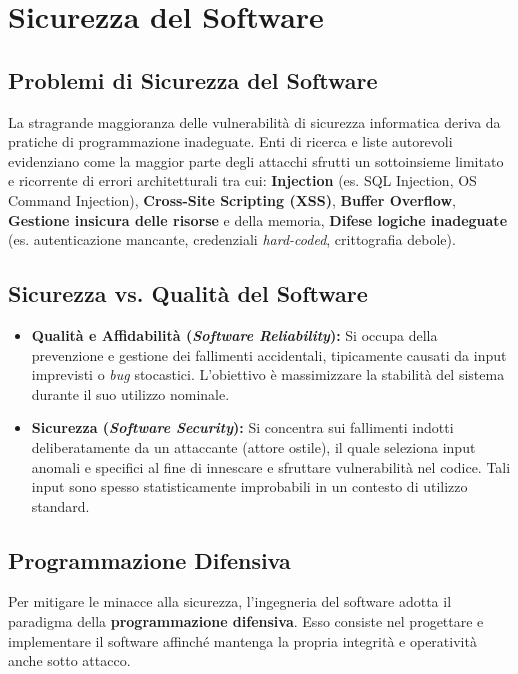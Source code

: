 \chapter{Sicurezza del Software}

\section{Problemi di Sicurezza del Software}
La stragrande maggioranza delle vulnerabilità di sicurezza informatica deriva da pratiche di programmazione inadeguate. Enti di ricerca e liste autorevoli evidenziano come la maggior parte degli attacchi sfrutti un sottoinsieme limitato e ricorrente di errori architetturali tra cui: \textbf{Injection} (es. SQL Injection, OS Command Injection), \textbf{Cross-Site Scripting (XSS)}, \textbf{Buffer Overflow}, \textbf{Gestione insicura delle risorse} e della memoria, \textbf{Difese logiche inadeguate} (es. autenticazione mancante, credenziali \textit{hard-coded}, crittografia debole).

\section{Sicurezza vs. Qualità del Software}
\begin{itemize}
    \item \textbf{Qualità e Affidabilità (\textit{Software Reliability}):} Si occupa della prevenzione e gestione dei fallimenti accidentali, tipicamente causati da input imprevisti o \textit{bug} stocastici. L'obiettivo è massimizzare la stabilità del sistema durante il suo utilizzo nominale.
    \item \textbf{Sicurezza (\textit{Software Security}):} Si concentra sui fallimenti indotti deliberatamente da un attaccante (attore ostile), il quale seleziona input anomali e specifici al fine di innescare e sfruttare vulnerabilità nel codice. Tali input sono spesso statisticamente improbabili in un contesto di utilizzo standard.
\end{itemize}

\section{Programmazione Difensiva}
Per mitigare le minacce alla sicurezza, l'ingegneria del software adotta il paradigma della \textbf{programmazione difensiva}. Esso consiste nel progettare e implementare il software affinché mantenga la propria integrità e operatività anche sotto attacco. 

